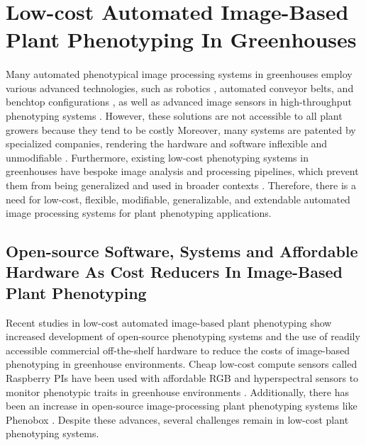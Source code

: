 \section{Low-cost  Automated Image-Based Plant Phenotyping In Greenhouses}
\paragraph{}
 Many automated phenotypical image processing systems in greenhouses employ various advanced technologies, such as robotics \cite{saddikMappingAgriculturalSoil}, automated conveyor belts, and benchtop configurations \cite{bruningDevelopmentHyperspectralDistribution2019, peironeAssessingEfficiencyPhenotyping2018}, as well as advanced image sensors in high-throughput phenotyping systems \cite{liHighThroughputPlantPhenotyping2021}. However, these solutions are not accessible to all plant growers because they tend to be costly \cite{lienLowcostOpensourcePlatform2019, tovarRaspberryPiPowered2018a, minerviniImageAnalysisNew2015} Moreover, many systems are patented by specialized companies, rendering the hardware and software inflexible and unmodifiable \cite{czedik-eysenbergPhenoBoxFlexibleAutomated2018}. Furthermore, existing low-cost phenotyping systems in greenhouses have bespoke image analysis and processing pipelines, which prevent them from being generalized and used in broader contexts \cite{arnalbarbedoDigitalImageProcessing2013, liReviewImagingTechniques2014}. Therefore, there is a need for low-cost, flexible, modifiable, generalizable, and extendable automated image processing systems for plant phenotyping applications.

\subsection{Open-source Software, Systems and Affordable Hardware As Cost Reducers In Image-Based Plant Phenotyping}
Recent studies in low-cost automated image-based plant phenotyping show increased development of open-source phenotyping systems and the use of readily accessible commercial off-the-shelf hardware \cite{liDigitizationVisualizationGreenhouse2015, minerviniImageAnalysisNew2015} to reduce the costs of image-based phenotyping in greenhouse environments. Cheap low-cost compute sensors called Raspberry PIs have been used with affordable RGB and hyperspectral sensors to monitor phenotypic traits in greenhouse environments \cite{tovarRaspberryPiPowered2018a}. Additionally, there has been an increase in open-source image-processing plant phenotyping systems like Phenobox \cite{czedik-eysenbergPhenoBoxFlexibleAutomated2018}. Despite these advances, several challenges remain in low-cost plant phenotyping systems.

